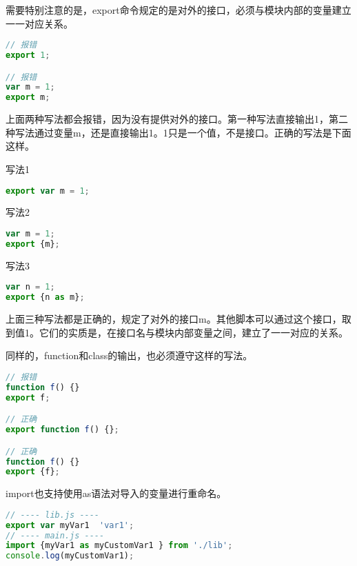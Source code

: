 需要特别注意的是，export命令规定的是对外的接口，必须与模块内部的变量建立一一对应关系。


\begin{lstlisting}[language=JavaScript]
// 报错
export 1;

// 报错
var m = 1;
export m;
\end{lstlisting}

上面两种写法都会报错，因为没有提供对外的接口。第一种写法直接输出1，第二种写法通过变量m，还是直接输出1。1只是一个值，不是接口。正确的写法是下面这样。

\begin{compactenum}
\item 写法1

\begin{lstlisting}[language=JavaScript]
export var m = 1;
\end{lstlisting}

\item 写法2

\begin{lstlisting}[language=JavaScript]
var m = 1;
export {m};
\end{lstlisting}

\item 写法3

\begin{lstlisting}[language=JavaScript]
var n = 1;
export {n as m};
\end{lstlisting}
\end{compactenum}

上面三种写法都是正确的，规定了对外的接口m。其他脚本可以通过这个接口，取到值1。它们的实质是，在接口名与模块内部变量之间，建立了一一对应的关系。

同样的，function和class的输出，也必须遵守这样的写法。

\begin{lstlisting}[language=JavaScript]
// 报错
function f() {}
export f;

// 正确
export function f() {};

// 正确
function f() {}
export {f};
\end{lstlisting}


import也支持使用as语法对导入的变量进行重命名。


\begin{lstlisting}[language=JavaScript]
// ---- lib.js ----
export var myVar1  'var1';
// ---- main.js ----
import {myVar1 as myCustomVar1 } from './lib';
console.log(myCustomVar1);
\end{lstlisting}

